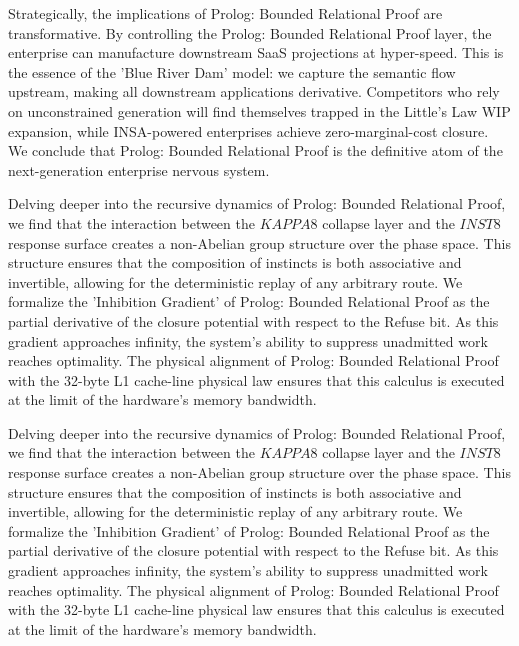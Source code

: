 \documentclass[12pt,a4paper,oneside]{book}
\begin{document}
Strategically, the implications of Prolog: Bounded Relational Proof are transformative. By controlling the Prolog: Bounded Relational Proof layer, the enterprise can manufacture downstream SaaS projections at hyper-speed. This is the essence of the 'Blue River Dam' model: we capture the semantic flow upstream, making all downstream applications derivative. Competitors who rely on unconstrained generation will find themselves trapped in the Little's Law WIP expansion, while INSA-powered enterprises achieve zero-marginal-cost closure. We conclude that Prolog: Bounded Relational Proof is the definitive atom of the next-generation enterprise nervous system. 

Delving deeper into the recursive dynamics of Prolog: Bounded Relational Proof, we find that the interaction between the $KAPPA8$ collapse layer and the $INST8$ response surface creates a non-Abelian group structure over the phase space. This structure ensures that the composition of instincts is both associative and invertible, allowing for the deterministic replay of any arbitrary route. We formalize the 'Inhibition Gradient' of Prolog: Bounded Relational Proof as the partial derivative of the closure potential with respect to the Refuse bit. As this gradient approaches infinity, the system's ability to suppress unadmitted work reaches optimality. The physical alignment of Prolog: Bounded Relational Proof with the 32-byte L1 cache-line physical law ensures that this calculus is executed at the limit of the hardware's memory bandwidth. 

Delving deeper into the recursive dynamics of Prolog: Bounded Relational Proof, we find that the interaction between the $KAPPA8$ collapse layer and the $INST8$ response surface creates a non-Abelian group structure over the phase space. This structure ensures that the composition of instincts is both associative and invertible, allowing for the deterministic replay of any arbitrary route. We formalize the 'Inhibition Gradient' of Prolog: Bounded Relational Proof as the partial derivative of the closure potential with respect to the Refuse bit. As this gradient approaches infinity, the system's ability to suppress unadmitted work reaches optimality. The physical alignment of Prolog: Bounded Relational Proof with the 32-byte L1 cache-line physical law ensures that this calculus is executed at the limit of the hardware's memory bandwidth. 
\end{document}
